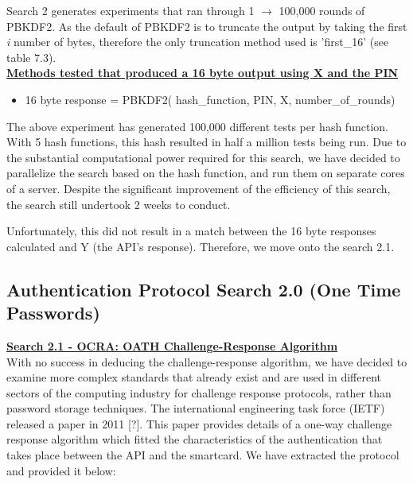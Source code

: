 \documentclass[bsc,frontabs,twoside,singlespacing,parskip,deptreport]{infthesis}     %
\begin{document}
Search 2 generates experiments that ran through 1 $\rightarrow$ 100,000 rounds of PBKDF2. As the default of PBKDF2 is to truncate the output by taking the first \textit{i} number of bytes, therefore the only truncation method used is 'first\_16' (see table 7.3).\\

\underline{\textbf{Methods tested that produced a 16 byte output using X and the PIN}}
\begin{itemize}
\item 16 byte response = PBKDF2( hash\_function, PIN, X, number\_of\_rounds)
\end{itemize}

The above experiment has generated 100,000 different tests per hash function. With 5 hash functions, this hash resulted in half a million tests being run. Due to the substantial computational power required for this search, we have decided to parallelize the search based on the hash function, and run them on separate cores of a server. Despite the significant improvement of the efficiency of this search, the search still undertook 2 weeks to conduct.

Unfortunately, this did not result in a match between the 16 byte responses calculated and Y (the API's response). Therefore, we move onto the search 2.1.

\subsection{Authentication Protocol Search 2.0 (One Time Passwords)}

\textbf{\underline{Search 2.1 - OCRA: OATH Challenge-Response Algorithm}}\\
With no success in deducing the challenge-response algorithm, we have decided to examine more complex standards that already exist and are used in different sectors of the computing industry for challenge response protocols, rather than password storage techniques. The international engineering task force (IETF) released a paper in 2011 [?]. This paper provides details of a one-way challenge response algorithm which fitted the characteristics of the authentication that takes place between the API and the smartcard. We have extracted the protocol and provided it below:
\end{document}
